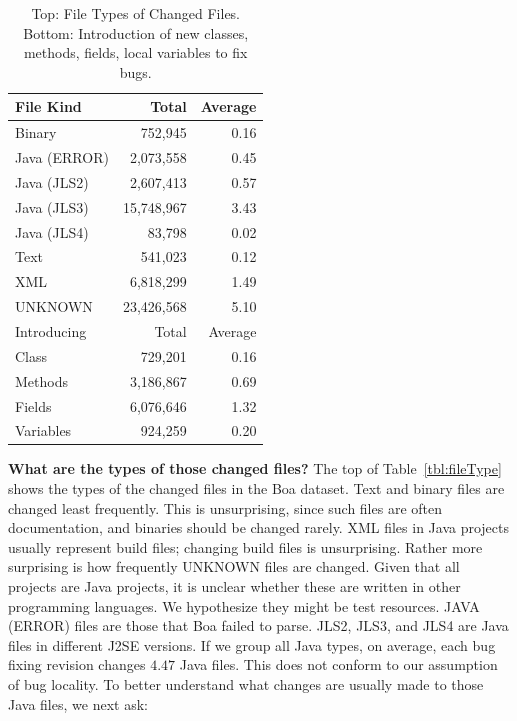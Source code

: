 \documentclass{sig-alternate-05-2015}
\begin{document}
\begin{table}
\centering
  \begin{tabular}{ l | r  r }
  \toprule
  File Kind & Total & Average \\ 
  \midrule
  Binary & 752,945 & 0.16 \\ 
  Java (ERROR) & 2,073,558 & 0.45 \\ 
  Java (JLS2) & 2,607,413 & 0.57 \\ 
  Java (JLS3) & 15,748,967 & 3.43 \\
  Java (JLS4)  & 83,798 & 0.02 \\ 
  Text & 541,023 & 0.12 \\ 
  XML & 6,818,299 & 1.49 \\ 
  UNKNOWN & 23,426,568 & 5.10 \\ 
\bottomrule
  \toprule
  Introducing & Total & Average \\ \midrule
  Class & 729,201 & 0.16 \\ 
  Methods & 3,186,867 & 0.69 \\ 
  Fields & 6,076,646 & 1.32 \\ 
  Variables & 924,259 & 0.20 \\ 
\bottomrule
  \end{tabular}
  \caption{Top: File Types of Changed Files.  Bottom: Introduction of new
    classes, methods, fields, local variables to fix bugs.   \label{tbl:fileType}\label{tbl:new}}
\vspace{-0.5cm}
\end{table}
\vspace{1ex}
\noindent\textbf{What are the types of those changed files?}
%
The top of Table~\ref{tbl:fileType} shows the types of the changed files in the
Boa dataset. 
Text and
binary files are changed least frequently. This is unsurprising, since such
files are often documentation, and binaries should be changed rarely. 
%
XML files in Java projects usually represent build files;
changing build files is unsurprising.  Rather more surprising is how frequently
UNKNOWN files are changed. Given that all projects are Java projects, it is
unclear whether these are written in other programming languages. We
hypothesize they might be test resources.  JAVA (ERROR) files are those that Boa failed to parse. JLS2, JLS3, and JLS4 are
Java files in different J2SE versions.  If we group
all Java types, on average, each bug fixing
revision changes $4.47$ Java files. This does not conform to our assumption of
bug locality.  To better understand what changes
are usually made to those Java files, we next ask:
\end{document}
